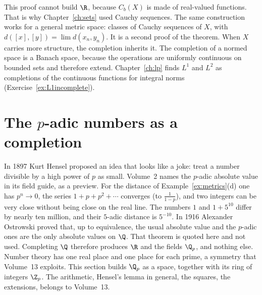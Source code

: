 This proof cannot build $\R$, because $C_b(X)$ is made of real-valued functions. That is why Chapter~\ref{ch:sets} used Cauchy sequences. The same construction works for a general metric space: classes of Cauchy sequences of $X$, with $d([x],[y])=\lim d(x_n,y_n)$. It is a second proof of the theorem. When $X$ carries more structure, the completion inherits it. The completion of a normed space is a Banach space, because the operations are uniformly continuous on bounded sets and therefore extend. Chapter~\ref{ch:lp} finds $L^1$ and $L^2$ as completions of the continuous functions for integral norms (Exercise~\ref{ex:L1incomplete}).

\section{The \texorpdfstring{$p$}{p}-adic numbers as a completion}

In 1897 Kurt Hensel proposed an idea that looks like a joke: treat a number divisible by a high power of $p$ as small. Volume~2 names the $p$-adic absolute value in its field guide, as a preview. For the distance of Example~\ref{ex:metrics}(d) one has $p^n\to0$, the series $1+p+p^2+\cdots$ converges (to $\frac1{1-p}$), and two integers can be very close without being close on the real line. The numbers $1$ and $1+5^{10}$ differ by nearly ten million, and their $5$-adic distance is $5^{-10}$. In 1916 Alexander Ostrowski proved that, up to equivalence, the usual absolute value and the $p$-adic ones are the only absolute values on $\Q$. That theorem is quoted here and not used. Completing $\Q$ therefore produces $\R$ and the fields $\Q_p$, and nothing else. Number theory has one real place and one place for each prime, a symmetry that Volume~13 exploits. This section builds $\Q_p$ as a space, together with its ring of integers $\Z_p$. The arithmetic, Hensel's lemma in general, the squares, the extensions, belongs to Volume~13.

